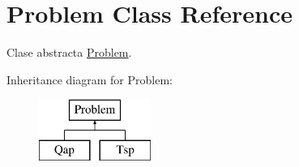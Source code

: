 \hypertarget{class_problem}{\section{Problem Class Reference}
\label{class_problem}
}


Clase abstracta \hyperlink{class_problem}{Problem}.  


Inheritance diagram for Problem\+:\begin{figure}[H]
\begin{center}
\leavevmode
\includegraphics[height=2.000000cm]{class_problem}
\end{center}
\end{figure}
